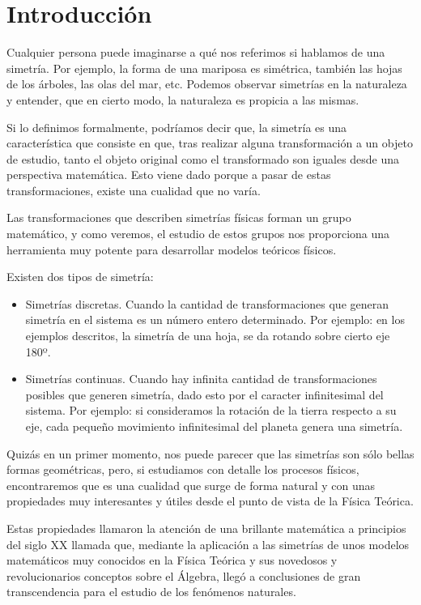 \section{Introducción}\label{sec:introduccion}

Cualquier persona puede imaginarse a qué nos referimos si hablamos de una simetría. Por ejemplo, la forma de una mariposa es simétrica, también las hojas de los árboles, las olas del mar, etc. Podemos observar simetrías en la naturaleza y entender, que en cierto modo, la naturaleza es propicia a las mismas.

Si lo definimos formalmente, podríamos decir que, la simetría es una característica que consiste en que, tras realizar alguna transformación a un objeto de estudio, tanto el objeto original como el transformado son iguales desde una perspectiva matemática. Esto viene dado porque a pasar de estas transformaciones, existe una cualidad que no varía.

Las transformaciones que describen simetrías físicas forman un grupo matemático, y como veremos, el estudio de estos grupos nos proporciona una herramienta muy potente para desarrollar modelos teóricos físicos.

Existen dos tipos de simetría:
\begin{itemize}
    \item Simetrías discretas. Cuando la cantidad de transformaciones que generan simetría en el sistema es un número entero determinado. Por ejemplo: en los ejemplos descritos, la simetría de una hoja, se da rotando sobre cierto eje 180º.
    \item Simetrías continuas. Cuando hay infinita cantidad de transformaciones posibles que generen simetría, dado esto por el caracter infinitesimal del sistema. Por ejemplo: si consideramos la rotación de la tierra respecto a su eje, cada pequeño movimiento infinitesimal del planeta genera una simetría.
\end{itemize}

Quizás en un primer momento, nos puede parecer que las simetrías son sólo bellas formas geométricas, pero, si estudiamos con detalle los procesos físicos, encontraremos que es una cualidad que surge de forma natural y con unas propiedades muy interesantes y útiles desde el punto de vista de la Física Teórica.

Estas propiedades llamaron la atención de una brillante matemática a principios del siglo XX llamada  que, mediante la aplicación a las simetrías de unos modelos matemáticos muy conocidos en la Física Teórica y sus novedosos y revolucionarios conceptos sobre el Álgebra, llegó a conclusiones de gran transcendencia para el estudio de los fenómenos naturales.

